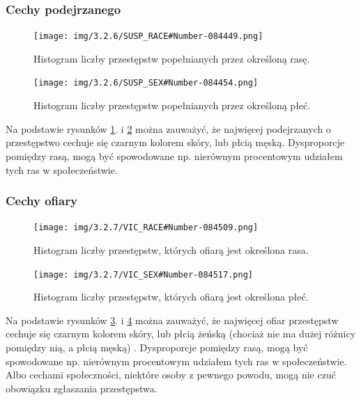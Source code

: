 \documentclass{classrep}
\begin{document}
{{            \subsubsection{Cechy podejrzanego} {
                \begin{figure}[!htbp]
                    \centering
                    \texttt{[image: img/3.2.6/SUSP\_RACE\#Number-084449.png]}
                    \caption{Histogram liczby przestępstw popełnianych przez określoną rasę.}
                    \label{susp_race}
                \end{figure}
                \begin{figure}[!htbp]
                    \centering
                    \texttt{[image: img/3.2.6/SUSP\_SEX\#Number-084454.png]}
                    \caption{Histogram liczby przestępstw popełnianych przez określoną płeć.}
                    \label{susp_sex}
                \end{figure}
                \FloatBarrier
                Na podstawie rysunków \ref{susp_race}. i \ref{susp_sex} można zauważyć,
                że najwięcej podejrzanych o przestępstwo cechuje się czarnym kolorem
                skóry, lub płcią męską. Dysproporcje pomiędzy rasą, mogą być
                spowodowane np. nierównym procentowym udziałem tych ras w społeczeństwie.
            }

            \subsubsection{Cechy ofiary} {
                 \begin{figure}[!htbp]
                    \centering
                    \texttt{[image: img/3.2.7/VIC\_RACE\#Number-084509.png]}
                    \caption{Histogram liczby przestępstw, których ofiarą jest określona rasa.}
                    \label{vic_race}
                \end{figure}
                \begin{figure}[!htbp]
                    \centering
                    \texttt{[image: img/3.2.7/VIC\_SEX\#Number-084517.png]}
                    \caption{Histogram liczby przestępstw, których ofiarą jest określona płeć.}
                    \label{vic_sex}
                \end{figure}
                \FloatBarrier

                Na podstawie rysunków \ref{vic_race}. i \ref{vic_sex} można zauważyć,
                że najwięcej ofiar przestępstw cechuje się czarnym kolorem skóry, lub
                płcią żeńską (chociaż nie ma dużej różnicy pomiędzy nią, a płcią męską)
                . Dysproporcje pomiędzy rasą, mogą być spowodowane np. nierównym
                procentowym udziałem tych ras w społeczeństwie. Albo cechami
                społeczności, niektóre osoby z pewnego powodu, mogą nie czuć obowiązku
                zgłaszania przestępstwa.
            }
            
}}
\end{document}
